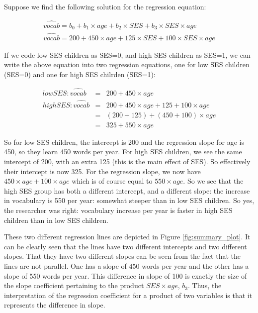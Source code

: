 \documentclass[]{report}\usepackage[]{graphicx}\usepackage[]{color}
\begin{document}
% 
% 

Suppose we find the following solution for the regression equation:

\begin{eqnarray}
\widehat{vocab} = b_0 + b_1 \times age + b_2 \times SES + b_3 \times SES  \times age  \\
\widehat{vocab} = 200 + 450 \times age + 125 \times SES + 100 \times SES  \times age
\end{eqnarray}

If we code low SES children as SES=0, and high SES children as SES=1, we can write the above equation into two regression equations, one for low SES children (SES=0) and one for high SES chilrden (SES=1):

\begin{eqnarray}
low SES: \widehat{vocab} &=&  200 + 450 \times age   \\
high SES: \widehat{vocab} &=& 200 + 450 \times age + 125  + 100   \times age\\
&=& (200 + 125) + (450 + 100) \times age \nonumber\\
&=& 325 + 550 \times age \nonumber
\end{eqnarray}

So for low SES children, the intercept is 200 and the regression slope for age is 450, so they learn 450 words per year. For high SES children, we see the same intercept of 200, with an extra 125 (this is the main effect of SES). So effectively their intercept is now 325. For the regression slope, we now have $450 \times age+ 100   \times age$ which is of course equal to $550 \times age$. So we see that the high SES group has both a different intercept, and a different slope: the increase in vocabulary is 550 per year: somewhat steeper than in low SES children. So yes, the researcher was right: vocabulary increase per year is faster in high SES children than in low SES children.

These two different regression lines are depicted in Figure \ref{fig:summary_plot}. It can be clearly seen that the lines have two different intercepts and two different slopes. That they have two different slopes can be seen from the fact that the lines are not parallel. One has a slope of 450 words per year and the other has a slope of 550 words per year. This difference in slope of 100 is exactly the size of the slope coefficient pertaining to the product $SES \times age$, $b_3$. Thus, the interpretation of the regression coefficient for a product of two variables is that it represents the difference in slope.
\end{document}
